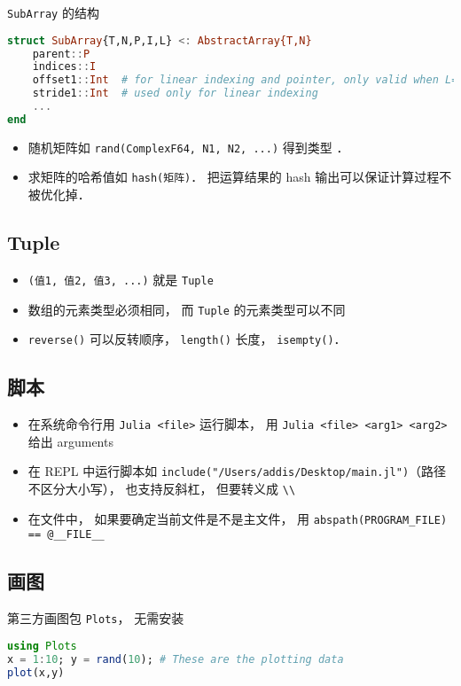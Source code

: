\verb|SubArray| 的结构
\begin{lstlisting}[language=julia]
struct SubArray{T,N,P,I,L} <: AbstractArray{T,N}
    parent::P
    indices::I
    offset1::Int  # for linear indexing and pointer, only valid when L==true
    stride1::Int  # used only for linear indexing
    ...
end
\end{lstlisting}

\begin{itemize}
\item 随机矩阵如 \verb|rand(ComplexF64, N1, N2, ...)| 得到类型 ．
\item 求矩阵的哈希值如 \verb|hash(矩阵)|． 把运算结果的 hash 输出可以保证计算过程不被优化掉．
\end{itemize}

\subsection{Tuple}
\begin{itemize}
\item \verb|(值1, 值2, 值3, ...)| 就是 \verb|Tuple|
\item 数组的元素类型必须相同， 而 \verb|Tuple| 的元素类型可以不同
\item \verb|reverse()| 可以反转顺序， \verb|length()| 长度， \verb|isempty()|．
\end{itemize}

\subsection{脚本}
\begin{itemize}
\item 在系统命令行用 \verb|Julia <file>| 运行脚本， 用 \verb|Julia <file> <arg1> <arg2>| 给出 arguments
\item 在 REPL 中运行脚本如 \verb|include("/Users/addis/Desktop/main.jl")|（路径不区分大小写）， 也支持反斜杠， 但要转义成 \verb|\\|
\item 在文件中， 如果要确定当前文件是不是主文件， 用 \verb|abspath(PROGRAM_FILE) == @__FILE__|
\end{itemize}

\subsection{画图}
第三方画图包 \verb|Plots|， 无需安装
\begin{lstlisting}[language=Julia]
using Plots
x = 1:10; y = rand(10); # These are the plotting data
plot(x,y)
\end{lstlisting}

